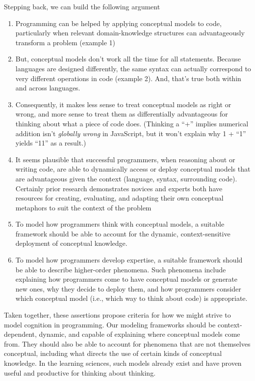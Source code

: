 Stepping back, we can build the following argument

\begin{enumerate}
\def\labelenumi{\arabic{enumi}.}
\tightlist
\item
  Programming can be helped by applying conceptual models to code,
  particularly when relevant domain-knowledge structures can
  advantageously transform a problem (example 1)
\item
  But, conceptual models don't work all the time for all statements.
  Because languages are designed differently, the same syntax can
  actually correspond to very different operations in code (example 2).
  And, that's true both within and across languages.
\item
  Consequently, it makes less sense to treat conceptual models as right
  or wrong, and more sense to treat them as differentially advantageous
  for thinking about what a piece of code does. (Thinking a ``+''
  implies numerical addition isn't \emph{globally wrong} in JavaScript,
  but it won't explain why 1 + ``1'' yields ``11'' as a result.)
\item
  It seems plausible that successful programmers, when reasoning about
  or writing code, are able to dynamically access or deploy conceptual
  models that are advantageous given the context (language, syntax,
  surrounding code). Certainly prior research demonstrates novices and experts both have resources for creating, evaluating, and adapting their own conceptual metaphors to suit the context of the problem \cite{hammer_static_2011,izsak_we_2003,izsak_students_2004}
\item
  To model how programmers think with conceptual models, a suitable
  framework should be able to account for the dynamic, context-sensitive
  deployment of conceptual knowledge.
\item
  To model how programmers develop expertise, a suitable framework
  should be able to describe higher-order phenomena. Such phenomena
  include explaining how programmers come to have conceptual models or
  generate new ones, why they decide to deploy them, and how programmers
  consider which conceptual model (i.e., which way to think about code)
  is appropriate.
\end{enumerate}

Taken together, these assertions propose criteria for how we might
strive to model cognition in programming. Our modeling frameworks should
be context-dependent, dynamic, and capable of explaining where
conceptual models come from. They should also be able to account for
phenomena that are not themselves conceptual, including what directs the
use of certain kinds of conceptual knowledge. In the learning sciences,
such models already exist and have proven useful and productive for
thinking about thinking.

